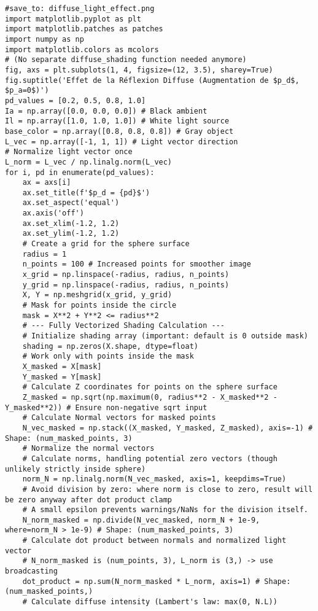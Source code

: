 \begin{verbatim}
#save_to: diffuse_light_effect.png
import matplotlib.pyplot as plt
import matplotlib.patches as patches
import numpy as np
import matplotlib.colors as mcolors
# (No separate diffuse_shading function needed anymore)
fig, axs = plt.subplots(1, 4, figsize=(12, 3.5), sharey=True)
fig.suptitle('Effet de la Réflexion Diffuse (Augmentation de $p_d$, $p_a=0$)')
pd_values = [0.2, 0.5, 0.8, 1.0]
Ia = np.array([0.0, 0.0, 0.0]) # Black ambient
Il = np.array([1.0, 1.0, 1.0]) # White light source
base_color = np.array([0.8, 0.8, 0.8]) # Gray object
L_vec = np.array([-1, 1, 1]) # Light vector direction
# Normalize light vector once
L_norm = L_vec / np.linalg.norm(L_vec)
for i, pd in enumerate(pd_values):
    ax = axs[i]
    ax.set_title(f'$p_d = {pd}$')
    ax.set_aspect('equal')
    ax.axis('off')
    ax.set_xlim(-1.2, 1.2)
    ax.set_ylim(-1.2, 1.2)
    # Create a grid for the sphere surface
    radius = 1
    n_points = 100 # Increased points for smoother image
    x_grid = np.linspace(-radius, radius, n_points)
    y_grid = np.linspace(-radius, radius, n_points)
    X, Y = np.meshgrid(x_grid, y_grid)
    # Mask for points inside the circle
    mask = X**2 + Y**2 <= radius**2
    # --- Fully Vectorized Shading Calculation ---
    # Initialize shading array (important: default is 0 outside mask)
    shading = np.zeros(X.shape, dtype=float)
    # Work only with points inside the mask
    X_masked = X[mask]
    Y_masked = Y[mask]
    # Calculate Z coordinates for points on the sphere surface
    Z_masked = np.sqrt(np.maximum(0, radius**2 - X_masked**2 - Y_masked**2)) # Ensure non-negative sqrt input
    # Calculate Normal vectors for masked points
    N_vec_masked = np.stack((X_masked, Y_masked, Z_masked), axis=-1) # Shape: (num_masked_points, 3)
    # Normalize the normal vectors
    # Calculate norms, handling potential zero vectors (though unlikely strictly inside sphere)
    norm_N = np.linalg.norm(N_vec_masked, axis=1, keepdims=True)
    # Avoid division by zero: where norm is close to zero, result will be zero anyway after dot product clamp
    # A small epsilon prevents warnings/NaNs for the division itself.
    N_norm_masked = np.divide(N_vec_masked, norm_N + 1e-9, where=norm_N > 1e-9) # Shape: (num_masked_points, 3)
    # Calculate dot product between normals and normalized light vector
    # N_norm_masked is (num_points, 3), L_norm is (3,) -> use broadcasting
    dot_product = np.sum(N_norm_masked * L_norm, axis=1) # Shape: (num_masked_points,)
    # Calculate diffuse intensity (Lambert's law: max(0, N.L))

\end{verbatim}
